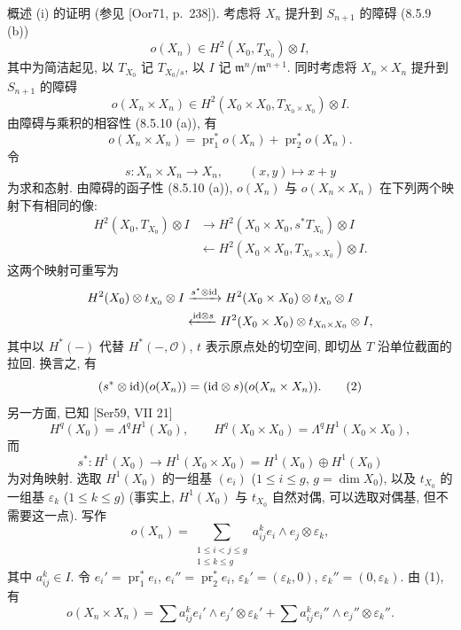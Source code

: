 概述 (i) 的证明 (参见 [Oor71, p.~238]). 考虑将 $X_n$ 提升到 $S_{n+1}$ 的障碍 (8.5.9 (b))
\[o(X_n)\in H^2(X_0,T_{X_0})\otimes I,\]
其中为简洁起见, 以 $T_{X_0}$ 记 $T_{X_0/s}$, 以 $I$ 记 $\mathfrak m^n/\mathfrak m^{n+1}$. 同时考虑将 $X_n\times X_n$ 提升到 $S_{n+1}$ 的障碍
\[o(X_n\times X_n)\in H^2(X_0\times X_0,T_{X_0\times X_0})\otimes I.\]
由障碍与乘积的相容性 (8.5.10 (a)), 有
\begin{equation}o(X_n\times X_n)=\operatorname{pr}_1^*o(X_n)+\operatorname{pr}_2^*o(X_n).\tag{1}\label{ch08:eq85231}\end{equation}
令
\[s:X_n\times X_n\longrightarrow X_n,\qquad(x,y)\longmapsto x+y\]
为求和态射. 由障碍的函子性 (8.5.10 (a)), $o(X_n)$ 与 $o(X_n\times X_n)$ 在下列两个映射下有相同的像:
\[\begin{aligned}
H^2(X_0,T_{X_0})\otimes I&\longrightarrow H^2(X_0\times X_0,s^*T_{X_0})\otimes I\\
&\longleftarrow H^2(X_0\times X_0,T_{X_0\times X_0})\otimes I.
\end{aligned}\]
这两个映射可重写为
\[\begin{aligned}
H^2(X_0)\otimes t_{X_0}\otimes I&\xrightarrow{s^*\otimes\mathrm{id}}H^2(X_0\times X_0)\otimes t_{X_0}\otimes I\\
&\xleftarrow{\mathrm{id}\otimes s}H^2(X_0\times X_0)\otimes t_{X_0\times X_0}\otimes I,
\end{aligned}\]
其中以 $H^*(-)$ 代替 $H^*(-,\mathcal O)$, $t$ 表示原点处的切空间, 即切丛 $T$ 沿单位截面的拉回. 换言之, 有
\begin{equation}(s^*\otimes\mathrm{id})(o(X_n))=(\mathrm{id}\otimes s)(o(X_n\times X_n)).\tag{2}\label{ch08:eq85232}\end{equation}
另一方面, 已知 [Ser59, VII 21]
\[H^q(X_0)=\Lambda^qH^1(X_0),\qquad H^q(X_0\times X_0)=\Lambda^qH^1(X_0\times X_0),\]
而
\[s^*:H^1(X_0)\longrightarrow H^1(X_0\times X_0)=H^1(X_0)\oplus H^1(X_0)\]
为对角映射. 选取 $H^1(X_0)$ 的一组基 $(e_i)$ ($1\leq i\leq g$, $g=\dim X_0$), 以及 $t_{X_0}$ 的一组基 $\varepsilon_k$ ($1\leq k\leq g$) (事实上, $H^1(X_0)$ 与 $t_{X_0}$ 自然对偶, 可以选取对偶基, 但不需要这一点). 写作
\[o(X_n)=\sum_{\substack{1\leq i<j\leq g\\1\leq k\leq g}}a_{ij}^ke_i\wedge e_j\otimes \varepsilon_k,\]
其中 $a_{ij}^k\in I$. 令 $e_i'=\operatorname{pr}_1^*e_i$, $e_i''=\operatorname{pr}_2^*e_i$, $\varepsilon_k'=(\varepsilon_k,0)$, $\varepsilon_k''=(0,\varepsilon_k)$. 由 (1), 有
\begin{equation}o(X_n\times X_n)=\sum a_{ij}^ke_i'\wedge e_j'\otimes \varepsilon_k'+\sum a_{ij}^ke_i''\wedge e_j''\otimes \varepsilon_k''.\tag{3}\label{ch08:eq85233}\end{equation}
